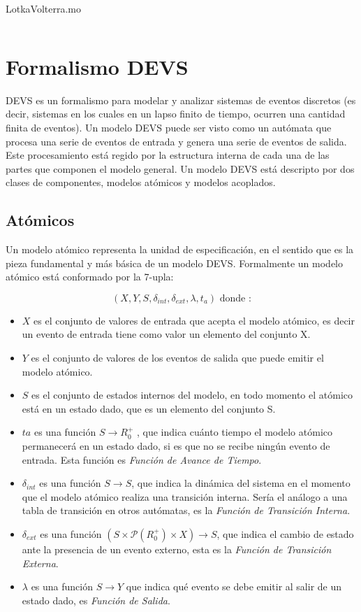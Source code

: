 	\begin{listing}[H]    
		\caption{LotkaVolterra.mo}
		\inputminted[linenos]{modelica}{src/lotka_volterra_qss.mo}
		\label{lst:LotkaVolterra.mo}
	\end{listing} 


\section{Formalismo DEVS}
	DEVS\cite{Zeigler} es un formalismo para modelar y analizar sistemas de eventos discretos (es decir, sistemas en los cuales en un lapso finito de tiempo, 
	ocurren una cantidad finita de eventos).
	Un modelo DEVS puede ser visto como un autómata que procesa una serie de eventos de entrada y genera una serie de eventos de salida. 
	Este procesamiento está regido por la estructura interna de cada una de las partes que componen el modelo general.
	Un modelo DEVS está descripto por dos clases de componentes, modelos atómicos y modelos acoplados.

	\subsection{Atómicos}
	Un modelo atómico representa la unidad  de especificación, en el sentido que es la pieza fundamental y más básica de un modelo DEVS. 
	Formalmente un modelo atómico está conformado por la 7-upla:

	\begin{equation} 
	(X, Y, S, \delta_{int} , \delta_{ext}, \lambda, t_{a}) \mbox{ donde :}
	\end{equation}

	\begin{itemize}
	\item $X$ es el conjunto de valores de entrada que acepta el modelo atómico, es decir un evento de entrada tiene como valor un elemento del conjunto X.
	\item $Y$ es el conjunto de valores de los eventos de salida que puede emitir el modelo atómico.
	\item $S$ es el conjunto de estados internos del modelo, en todo momento el atómico está en un estado dado, que es un elemento del conjunto S.
	\item $ta$ es una función $S \to R^{+}_{0}$ , que indica cuánto tiempo el modelo atómico permanecerá en un estado dado, si es que no se recibe ningún 
	evento de entrada. Esta función es \emph{Función de Avance de Tiempo}.
	\item $\delta_{int}$ es una función $S \to S$, que indica la dinámica del sistema en el momento que el modelo atómico realiza una transición interna. 
	Sería el análogo a una tabla de transición en otros autómatas, es la \emph{Función de Transición Interna}.
	\item $\delta_{ext}$ es una función $(S \times \mathcal{P}(R^{+}_{0}) \times X) \to S$, que indica el cambio de estado ante la presencia de un evento 
	externo, esta es la \emph{Función de Transición Externa}.
	\item $\lambda$ es una función $S \to Y$ que indica qué evento se debe emitir al salir de un estado dado, es \emph{Función de Salida}.
	\end{itemize}

